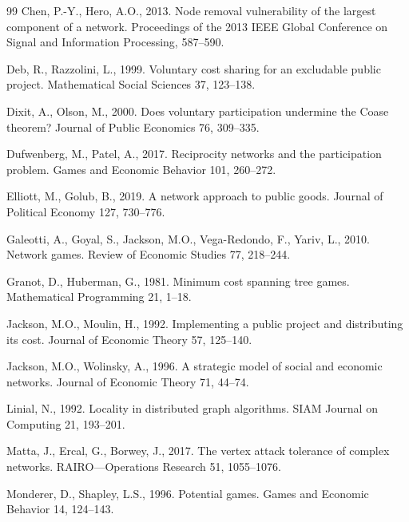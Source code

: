 \documentclass[preprint,12pt,authoryear]{elsarticle}
\begin{document}
\begin{thebibliography}{99}
Chen, P.-Y., Hero, A.O., 2013.
Node removal vulnerability of the largest component of a network.
Proceedings of the 2013 IEEE Global Conference on Signal and Information
Processing, 587--590.

Deb, R., Razzolini, L., 1999.
Voluntary cost sharing for an excludable public project.
Mathematical Social Sciences 37, 123--138.

Dixit, A., Olson, M., 2000.
Does voluntary participation undermine the Coase theorem?
Journal of Public Economics 76, 309--335.

Dufwenberg, M., Patel, A., 2017.
Reciprocity networks and the participation problem.
Games and Economic Behavior 101, 260--272.

Elliott, M., Golub, B., 2019.
A network approach to public goods. Journal of Political Economy 127, 730--776.

Galeotti, A., Goyal, S., Jackson, M.O., Vega-Redondo, F., Yariv, L., 2010.
Network games. Review of Economic Studies 77, 218--244.

Granot, D., Huberman, G., 1981.
Minimum cost spanning tree games. Mathematical Programming 21, 1--18.

Jackson, M.O., Moulin, H., 1992.
Implementing a public project and distributing its cost.
Journal of Economic Theory 57, 125--140.

Jackson, M.O., Wolinsky, A., 1996.
A strategic model of social and economic networks.
Journal of Economic Theory 71, 44--74.

Linial, N., 1992.
Locality in distributed graph algorithms.
SIAM Journal on Computing 21, 193--201.

Matta, J., Ercal, G., Borwey, J., 2017.
The vertex attack tolerance of complex networks.
RAIRO---Operations Research 51, 1055--1076.

Monderer, D., Shapley, L.S., 1996.
Potential games. Games and Economic Behavior 14, 124--143.


\end{thebibliography}
\end{document}
